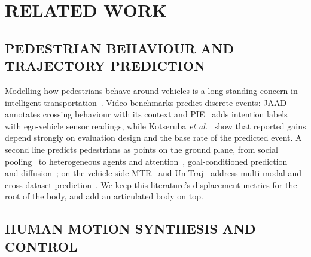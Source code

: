 \documentclass{ieeeoj}
\newcommand{\etal}{\textit{et al.}\xspace}
\begin{document}
\section{RELATED WORK}
\label{sec:related}

\subsection{PEDESTRIAN BEHAVIOUR AND TRAJECTORY PREDICTION}

Modelling how pedestrians behave around vehicles is a long-standing concern in intelligent transportation~\cite{camara2021pedmodels1,camara2021pedmodels2}. Video benchmarks predict discrete events: JAAD~\cite{rasouli2017jaad} annotates crossing behaviour with its context and PIE~\cite{rasouli2019pie} adds intention labels with ego-vehicle sensor readings, while Kotseruba \etal~\cite{kotseruba2021benchmark} show that reported gains depend strongly on evaluation design and the base rate of the predicted event. A second line predicts pedestrians as points on the ground plane, from social pooling~\cite{alahi2016sociallstm,gupta2018socialgan,mohamed2020stgcnn} to heterogeneous agents and attention~\cite{salzmann2020trajectron,yuan2021agentformer}, goal-conditioned prediction~\cite{mangalam2020pecnet,mangalam2021ynet} and diffusion~\cite{gu2022mid,mao2023led}; on the vehicle side MTR~\cite{shi2022mtr} and UniTraj~\cite{feng2024unitraj} address multi-modal and cross-dataset prediction~\cite{rudenko2020survey,karle2021survey}. We keep this literature's displacement metrics for the root of the body, and add an articulated body on top.

\subsection{HUMAN MOTION SYNTHESIS AND CONTROL}
\end{document}
